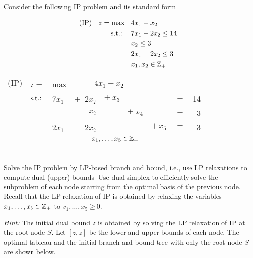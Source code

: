 Consider the following IP problem and its standard form

\begin{minipage}[c]{0.4\textwidth}
\begin{align*}
\text{(IP)} \quad z = \text{max} \quad & 4x_1 - x_2      \\
                   \mathop{\text{s.t.:~}} \quad & 7x_1 -  2x_2    \leq 14\\
                             & x_2 \leq 3 \\
		       		         & 2x_1 -     2x_2 \leq 3 \\
		     	             & x_1,x_2 \in \mathbb{Z}_+
\end{align*}
\end{minipage}
\begin{minipage}{0.5\textwidth}
\begin{table}[H]
	\centering
	\begin{tabular}{V{0.3cm} V{0.6cm} V{0.2cm} r V{0.1cm} V{0.1cm} V{0.4cm} V{0.2cm} r r}
        $\text{(IP)}$  & z =   &     max &                 \vspace{5pt}               \\
		               & $\mathop{\text{s.t.:~}}$ &  7$x_1$ &  $+$\ 2$x_2$ & $+ \ x_3$ &           &           & $=$ &  14 &             \\
					   &       &         &        $x_2$ &           & $+ \ x_4$ &           & $=$ &   3 &             \\
					   &       &  2$x_1$ &  $-$\ 2$x_2$ &           &           & $+ \ x_5$ & $=$ &   3 & \vspace{5pt}\\ 
	                   &    
	\end{tabular}
\end{table}
\end{minipage}\\

Solve the IP problem by LP-based branch and bound, i.e., use LP relaxations to compute dual (upper) bounds. Use dual simplex to efficiently solve the subproblem of each node starting from the optimal basis of the previous node. Recall that the LP relaxation of IP is obtained by relaxing the variables $x_1,\dots,x_5\in \mathbb{Z}_+$ to $x_1,\dots,x_5 \geq 0$.

\emph{Hint:} The initial dual bound $\overline{z}$ is obtained by solving the LP relaxation of IP at the root node $S$. Let $[\underline{z},\overline{z}]$ be the lower and upper bounds of each node. The optimal tableau and the initial branch-and-bound tree with only the root node $S$ are shown below. 

